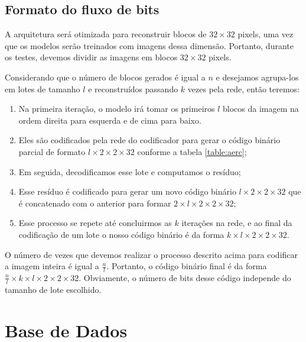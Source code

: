 


\subsection{Formato do fluxo de bits}

A arquitetura será otimizada para reconstruir blocos de $32 \times 32$ pixels, uma vez que os modelos serão treinados com imagens dessa dimensão. Portanto, durante os testes, devemos dividir as imagens em blocos $32 \times 32$ pixels. 

Considerando que o número de blocos gerados é igual a $n$ e desejamos agrupa-los em lotes de tamanho $l$ e reconstruídos passando $k$ vezes pela rede, então teremos:
\begin{enumerate}
	\item Na primeira iteração, o modelo irá tomar os primeiros $l$ blocos da imagem na ordem direita para esquerda e de cima para baixo. 	\item Eles são codificados pela rede do codificador para gerar o código binário parcial de formato $l \times 2 \times 2 \times 32$ conforme a tabela \ref{table:aerc};
	\item Em seguida, decodificamos esse lote e computamos o resíduo;
	\item  Esse resíduo é codificado para gerar um novo código binário $l \times 2 \times 2 \times 32$ que é concatenado com o anterior para formar $2 \times l \times 2 \times 2 \times 32$;
	\item Esse processo se repete até concluirmos as $k$ iterações na rede, e ao final da codificação de um lote o nosso código binário é da forma $k \times l \times 2 \times 2 \times 32$. 
\end{enumerate}

O número de vezes que devemos realizar o processo descrito acima para codificar a imagem inteira é igual a $\frac{n}{l}$. Portanto, o código binário final é da forma $\frac{n}{l} \times k \times l \times 2 \times 2 \times 32$. Obviamente, o número de bits desse código independe do tamanho de lote escolhido. 


\section {Base de Dados}


